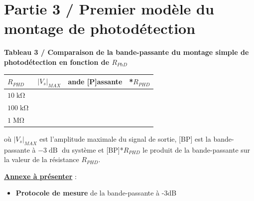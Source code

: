 \section{Partie 3 / Premier modèle du montage de photodétection}

\noindent
{}


\newpage

\textbf{Tableau 3 / Comparaison de la bande-passante du montage simple de photodétection en fonction de $R_{PhD}$}

\begin{center}
\Large{
\begin{tabular}{|>{\centering\arraybackslash}p{2cm}|>{\centering\arraybackslash}p{3cm}|>{\centering\arraybackslash}p{5cm}|>{\centering\arraybackslash}p{4cm}|}
  \hline
  $R_{PHD}$ & $|V_s|_{MAX}$ & [B]ande [P]assante & [BP]*$R_{PHD}$ \\
  \hline
  $10\operatorname{k\Omega}$ & & & \rule{0pt}{1.8em} \\
  \hline
  $100\operatorname{k\Omega}$ & & & \rule{0pt}{1.8em} \\
  \hline
  $1\operatorname{M\Omega}$ & & & \rule{0pt}{1.8em} \\
  \hline
\end{tabular}
}
\end{center}

où $|V_s|_{MAX}$ est l'amplitude maximale du signal de sortie, [BP] est la bande-passante à $-3\operatorname{dB}$ du système et [BP]*$R_{PHD}$ le produit de la bande-passante sur la valeur de la résistance $R_{PHD}$.



\medskip

\noindent
\underline{\textbf{Annexe à présenter}} :

\begin{itemize}[label=$\square$]
	\item \textbf{Protocole de mesure} de la bande-passante à -3dB
\end{itemize}


